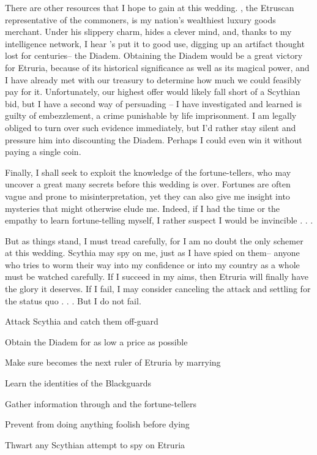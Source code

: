 \documentclass[char]{Kos}
\begin{document}
There are other resources that I hope to gain at this wedding. \cMerchant{}, the Etruscan representative of the commoners, is my nation's wealthiest luxury goods merchant. Under his slippery charm, \cMerchant{\they} hides a clever mind, and, thanks to my intelligence network, I hear \cMerchant{\they}'s put it to good use, digging up an artifact thought lost for centuries-- the Diadem. Obtaining the Diadem would be a great victory for Etruria, because of its historical significance as well as its magical power, and I have already met with our treasury to determine how much we could feasibly pay for it. Unfortunately, our highest offer would likely fall short of a Scythian bid, but I have a second way of persuading \cMerchant{}-- I have investigated \cMerchant{\them} and learned \cMerchant{\they} is guilty of embezzlement, a crime punishable by life imprisonment. I am legally obliged to turn over such evidence immediately, but I'd rather stay silent and pressure him into discounting the Diadem. Perhaps I could even win it without paying a single coin.

Finally, I shall seek to exploit the knowledge of the fortune-tellers, who may uncover a great many secrets before this wedding is over. Fortunes are often vague and prone to misinterpretation, yet they can also give me insight into mysteries that might otherwise elude me. Indeed, if I had the time or the empathy to learn fortune-telling myself, I rather suspect I would be invincible . . .

But as things stand, I must tread carefully, for I am no doubt the only schemer at this wedding. Scythia may spy on me, just as I have spied on them-- anyone who tries to worm their way into my confidence or into my country as a whole must be watched carefully. If I succeed in my aims, then Etruria will finally have the glory it deserves. If I fail, I may consider canceling the attack and settling for the status quo . . . But I do not fail.

\begin{itemz}[Goals]
 \item Attack Scythia and catch them off-guard
 \item Obtain the Diadem for as low a price as possible
 \item Make sure \cBride{} becomes the next ruler of Etruria by marrying \cGroom{}
 \item Learn the identities of the Blackguards
 \item Gather information through \cBride{} and the fortune-tellers
 \item Prevent \cPoet{} from doing anything foolish before dying
 \item Thwart any Scythian attempt to spy on Etruria
\end{itemz}
\end{document}
